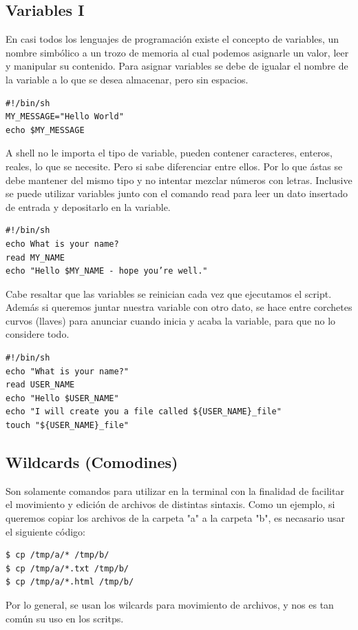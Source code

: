 \documentclass[12pt]{article}
\begin{document}
\subsection*{Variables I}
En casi todos los lenguajes de programación existe el concepto de variables, un nombre simbólico a un trozo de memoria al cual podemos asignarle un valor, leer y manipular su contenido. Para asignar variables se debe de igualar el nombre de la variable a lo que se desea almacenar, pero sin espacios.
\begin{verbatim}
#!/bin/sh
MY_MESSAGE="Hello World"
echo $MY_MESSAGE
\end{verbatim}
A shell no le importa el tipo de variable, pueden contener caracteres, enteros, reales, lo que se necesite. Pero si sabe diferenciar entre ellos. Por lo que ástas se debe mantener del mismo tipo y no intentar mezclar números con letras. Inclusive se puede utilizar variables junto con el comando read para leer un dato insertado de entrada y depositarlo en la variable.
\begin{verbatim}
#!/bin/sh
echo What is your name?
read MY_NAME
echo "Hello $MY_NAME - hope you’re well."
\end{verbatim}
Cabe resaltar que las variables se reinician cada vez que ejecutamos el script. Además si queremos juntar nuestra variable con otro dato, se hace entre corchetes curvos (llaves) para anunciar cuando inicia y acaba la variable, para que no lo considere todo. 
\begin{verbatim}
#!/bin/sh
echo "What is your name?"
read USER_NAME
echo "Hello $USER_NAME"
echo "I will create you a file called ${USER_NAME}_file"
touch "${USER_NAME}_file"
\end{verbatim}

\subsection*{Wildcards (Comodines)}
Son solamente comandos para utilizar en la terminal con la finalidad de facilitar el movimiento y edición de archivos de distintas sintaxis. Como un ejemplo, si queremos copiar los archivos de la carpeta "a" a la carpeta "b", es necasario usar el siguiente código:
\begin{verbatim}
$ cp /tmp/a/* /tmp/b/
$ cp /tmp/a/*.txt /tmp/b/
$ cp /tmp/a/*.html /tmp/b/
\end{verbatim}
Por lo general, se usan los wilcards para movimiento de archivos, y nos es tan común su uso en los scritps.
\end{document}
